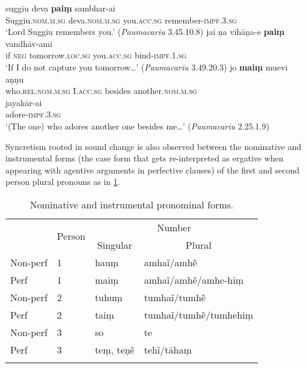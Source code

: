 \documentclass[output=paper,
modfonts
]{LSP/langsci}
\begin{document}
\begin{exe}
\ex\label{ex:stu}
\begin{xlist}
\ex \gll suggīu deva \textbf{paiṃ} sambhar-ai \\
Suggiu.\textsc{nom.m.sg} deva.\textsc{nom.m.sg} you.\textsc{acc.sg} remember-\textsc{impf.3.sg} \\
\glt `Lord Suggiu remembers you.'  (\textit{Paumacariu} 3.45.10.8)
\ex \gll jai ṇa vihāṇa-e \textbf{paiṃ} vandhāv-ami \\
if \textsc{neg} tomorrow.\textsc{loc.sg} you.\textsc{acc.sg} bind-\textsc{impf.1.sg} \\
\glt `If I do not capture you tomorrow\dots{}' (\textit{Paumacariu} 3.49.20.3)
\ex \gll jo \textbf{maiṃ} muevi aṇṇu \\
who.\textsc{rel.nom.m.sg} I.\textsc{acc.sg} besides another.\textsc{nom.m.sg} \\

\gll jayakār-ai \\
adore-\textsc{impf.3.sg} \\
\glt `(The one) who adores another one besides me\dots{}'  (\textit{Paumacariu}  2.25.1.9)
\end{xlist}
\end{exe}



Syncretism rooted in sound change is also observed
between  the nominative and instrumental forms (the case form that gets re-interpreted as ergative when appearing with agentive arguments in perfective clauses) of the first and second
person plural pronouns as in \cref{tab:nominst}.

\begin{table}
\begin{tabular}[t]{llll}
\lsptoprule
\multicolumn{1}{c}{\multirow{2}{*}{Aspect}} & \multicolumn{1}{c}{\multirow{2}{*}{Person}} & \multicolumn{2}{c}{Number}\\ \cmidrule{3-4}
& & \multicolumn{1}{c}{Singular} & \multicolumn{1}{c}{Plural} \\
\midrule
Non-perf & 1   & hauṃ & amhaĩ/amhẽ\\
Perf & 1  &  maiṃ &  amhaĩ/amhẽ/amhe-hiṃ \\
Non-perf & 2  & tuhuṃ & tumhaĩ/tumhẽ \\
Perf & 2 & taiṃ & tumhaĩ/tumhẽ/tumhehiṃ\\
Non-perf & 3  & so & te \\
Perf & 3  & teṃ, teṇẽ  & tehĩ/tāhaṃ \\
\lspbottomrule
\end{tabular}
\caption{Nominative and instrumental pronominal forms.}
\label{tab:nominst}
\end{table}
\end{document}
